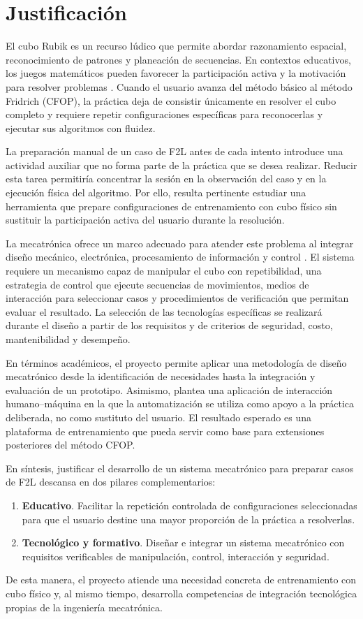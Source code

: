 \section{Justificación}
El cubo Rubik es un recurso lúdico que permite abordar razonamiento espacial, reconocimiento de patrones y planeación de secuencias. En contextos educativos, los juegos matemáticos pueden favorecer la participación activa y la motivación para resolver problemas \cite{SilvaMera2024}. Cuando el usuario avanza del método básico al método Fridrich (CFOP), la práctica deja de consistir únicamente en resolver el cubo completo y requiere repetir configuraciones específicas para reconocerlas y ejecutar sus algoritmos con fluidez.

La preparación manual de un caso de F2L antes de cada intento introduce una actividad auxiliar que no forma parte de la práctica que se desea realizar. Reducir esta tarea permitiría concentrar la sesión en la observación del caso y en la ejecución física del algoritmo. Por ello, resulta pertinente estudiar una herramienta que prepare configuraciones de entrenamiento con cubo físico sin sustituir la participación activa del usuario durante la resolución.

La mecatrónica ofrece un marco adecuado para atender este problema al integrar diseño mecánico, electrónica, procesamiento de información y control \cite{Perdomo2003,AquinoRobles2019}. El sistema requiere un mecanismo capaz de manipular el cubo con repetibilidad, una estrategia de control que ejecute secuencias de movimientos, medios de interacción para seleccionar casos y procedimientos de verificación que permitan evaluar el resultado. La selección de las tecnologías específicas se realizará durante el diseño a partir de los requisitos y de criterios de seguridad, costo, mantenibilidad y desempeño.

En términos académicos, el proyecto permite aplicar una metodología de diseño mecatrónico desde la identificación de necesidades hasta la integración y evaluación de un prototipo. Asimismo, plantea una aplicación de interacción humano--máquina en la que la automatización se utiliza como apoyo a la práctica deliberada, no como sustituto del usuario. El resultado esperado es una plataforma de entrenamiento que pueda servir como base para extensiones posteriores del método CFOP.

En síntesis, justificar el desarrollo de un sistema mecatrónico para preparar casos de F2L descansa en dos pilares complementarios:
\begin{enumerate}
    \item \textbf{Educativo}. Facilitar la repetición controlada de configuraciones seleccionadas para que el usuario destine una mayor proporción de la práctica a resolverlas.
    \item \textbf{Tecnológico y formativo}. Diseñar e integrar un sistema mecatrónico con requisitos verificables de manipulación, control, interacción y seguridad.
\end{enumerate}

De esta manera, el proyecto atiende una necesidad concreta de entrenamiento con cubo físico y, al mismo tiempo, desarrolla competencias de integración tecnológica propias de la ingeniería mecatrónica.
